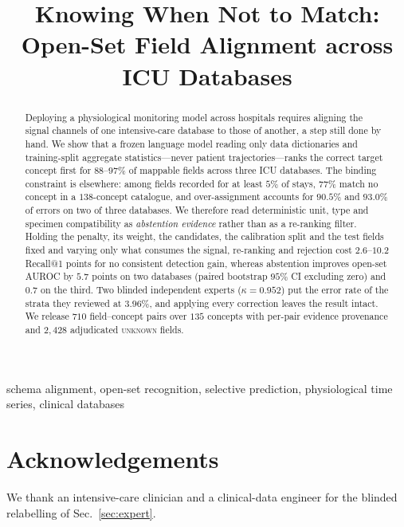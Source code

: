 \documentclass{article}
\title{Knowing When Not to Match:\\Open-Set Field Alignment across ICU Databases}
\begin{document}
\maketitle

\begin{abstract}

Deploying a physiological monitoring model across hospitals requires aligning the
signal channels of one intensive-care database to those of another, a step still done
by hand. We show that a frozen language model reading only data dictionaries and
training-split aggregate statistics---never patient trajectories---ranks the correct
target concept first for $88$--$97\%$ of mappable fields across three ICU databases.
The binding constraint is elsewhere: among fields recorded for at least $5\%$ of stays,
$77\%$ match no concept in a $138$-concept catalogue, and over-assignment accounts for
$90.5\%$ and $93.0\%$ of errors on two of three databases. We therefore read
deterministic unit, type and specimen compatibility as \emph{abstention evidence}
rather than as a re-ranking filter. Holding the penalty, its weight, the candidates, the
calibration split and the test fields fixed and varying only what consumes the signal,
re-ranking and rejection cost $2.6$--$10.2$ Recall@1 points for no consistent detection
gain, whereas abstention improves open-set AUROC by $5.7$ points on two databases
(paired bootstrap $95\%$ CI excluding zero) and $0.7$ on the third. Two blinded
independent experts ($\kappa{=}0.952$) put the error rate of the strata they reviewed at
$3.96\%$, and applying every correction leaves the result intact. We release $710$ field--concept pairs over $135$ concepts with per-pair
evidence provenance and $2{,}428$ adjudicated \textsc{unknown} fields.
\end{abstract}

\begin{keywords}
schema alignment, open-set recognition, selective prediction, physiological time
series, clinical databases
\end{keywords}






\section{Acknowledgements}
We thank an intensive-care clinician and a clinical-data engineer for the blinded
relabelling of Sec.~\ref{sec:expert}.
\end{document}
